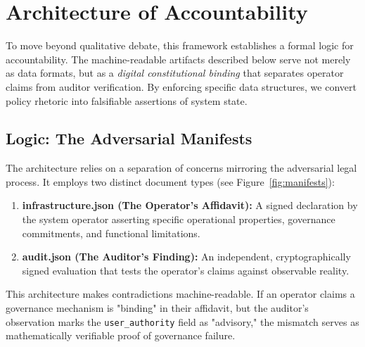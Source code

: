 \section{Architecture of Accountability}
\label{appendix:architecture}

To move beyond qualitative debate, this framework establishes a formal logic for accountability. The machine-readable artifacts described below serve not merely as data formats, but as a \textit{digital constitutional binding} that separates operator claims from auditor verification. By enforcing specific data structures, we convert policy rhetoric into falsifiable assertions of system state.

\subsection{Logic: The Adversarial Manifests}

The architecture relies on a separation of concerns mirroring the adversarial legal process. It employs two distinct document types (see Figure~\ref{fig:manifests}):

\begin{enumerate}
    \item \textbf{infrastructure.json (The Operator's Affidavit):} A signed declaration by the system operator asserting specific operational properties, governance commitments, and functional limitations.
    \item \textbf{audit.json (The Auditor's Finding):} An independent, cryptographically signed evaluation that tests the operator's claims against observable reality.
\end{enumerate}

This architecture makes contradictions machine-readable. If an operator claims a governance mechanism is "binding" in their affidavit, but the auditor's observation marks the \texttt{user\_authority} field as "advisory," the mismatch serves as mathematically verifiable proof of governance failure.

